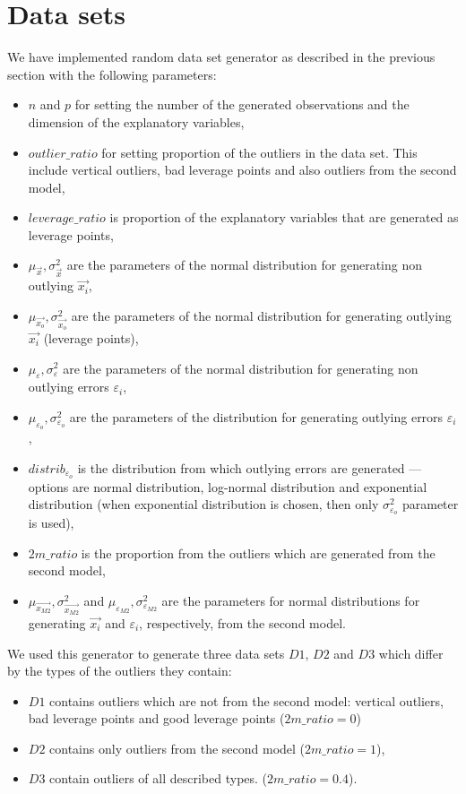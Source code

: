 \section{Data sets}
We have implemented random data set generator as described in the previous section with the following parameters:
\begin{itemize}
    \item $n$ and $p$ for setting the number of the generated observations and the dimension of the explanatory variables,
    \item $outlier\_ratio$ for setting proportion of the outliers in the data set. This include vertical outliers, bad leverage points and also outliers from the second model,
    \item $leverage\_ratio$ is proportion of the explanatory variables that are generated as leverage points,
    \item $\mu_{\vec{x}}, \sigma^{2}_{\vec{x}}$ are the parameters of the normal distribution for generating non outlying $\vec{x_i}$,
    \item $\mu_{\vec{x_o}}, \sigma^{2}_{\vec{x_o}}$ are the parameters of the normal distribution for generating outlying $\vec{x_i}$ (leverage points),
    \item $\mu_{\varepsilon}, \sigma^{2}_{\varepsilon}$ are the parameters of the normal distribution for generating non outlying errors $\varepsilon_i$,
    \item $\mu_{\varepsilon_o}, \sigma^{2}_{\varepsilon_o}$ are the parameters of the distribution for generating outlying errors $\varepsilon_i$,
    \item $distrib_{\varepsilon_o}$ is the distribution from which outlying errors are generated --- options are normal distribution, log-normal distribution and exponential distribution (when exponential distribution is chosen, then only $\sigma^{2}_{\varepsilon_o}$ parameter is used),
    \item $2m\_ratio$ is the proportion from the outliers which are generated from the second model,
    \item $\mu_{\vec{x_{M2}}}, \sigma^{2}_{\vec{x_{M2}}}$ and $\mu_{\varepsilon_{M2}}, \sigma^{2}_{\varepsilon_{M2}}$ are the parameters for normal distributions for generating $\vec{x_i}$ and $\varepsilon_i$, respectively, from the second model.
\end{itemize}

We used this generator to generate three data sets $D1$, $D2$ and $D3$ which differ by the types of the outliers they contain:
\begin{itemize}
    \item $D1$ contains outliers which are not from the second model: vertical outliers, bad leverage points and good leverage points ($2m\_ratio = 0$)
    \item $D2$ contains only outliers from the second model ($2m\_ratio = 1$),
    \item $D3$ contain outliers of all described types. ($2m\_ratio = 0.4$).
\end{itemize}

